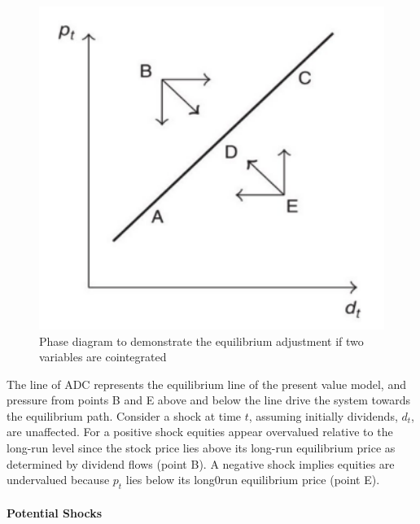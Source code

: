 \documentclass[11pt]{article}
\begin{document}
\begin{figure}[h]
    \centering
    \includegraphics[width=12cm]{pics/equilibrium adjustment.png}
    \caption{Phase diagram to demonstrate the equilibrium adjustment if two variables are cointegrated}
    \label{fig:equilibrium adjustment}
\end{figure}

The line of ADC represents the equilibrium line of the present value model, and pressure from points B and E above and below the line drive the system towards the equilibrium path. Consider a shock at time $t$, assuming initially dividends, $d_t$, are unaffected. For a positive shock equities appear overvalued relative to the long-run level since the stock price lies above its long-run equilibrium price as determined by dividend flows (point B). A negative shock implies equities are undervalued because $p_t$ lies below its long0run equilibrium price (point E).

\paragraph{Potential Shocks} \mbox{}
\end{document}
